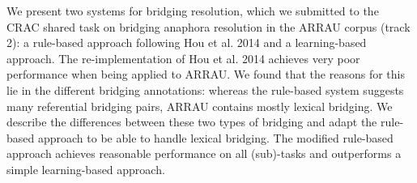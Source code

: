 We present two systems for bridging resolution, which we submitted to the CRAC shared task on bridging anaphora resolution in the ARRAU corpus (track 2): a rule-based approach following Hou et al. 2014 and a learning-based approach. The re-implementation of Hou et al. 2014 achieves very poor performance when being applied to ARRAU. We found that the reasons for this lie in the different bridging annotations: whereas the rule-based system suggests many referential bridging pairs, ARRAU contains mostly lexical bridging. We describe the differences between these two types of bridging and adapt the rule-based approach to be able to handle lexical bridging. The modified rule-based approach achieves reasonable performance on all (sub)-tasks and outperforms a simple learning-based approach.
